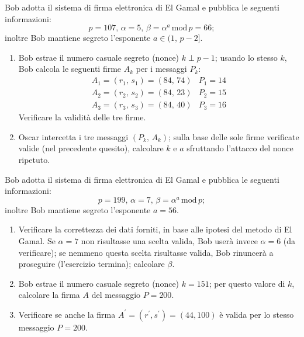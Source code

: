         Bob adotta il sistema di firma elettronica di El Gamal e pubblica le seguenti informazioni: \[
            p=107,\, \alpha = 5,\, \beta = \alpha^a\,\mathrm{mod}\,p=66
        ;\] inoltre Bob mantiene segreto l'esponente $a\in (1,\,p-2]$.
        \begin{enumerate}
            \item Bob estrae il numero casuale segreto (nonce) $k\perp p-1$; usando lo stesso $k$, 
                Bob calcola le seguenti firme $A_k$ per i messaggi $P_k$:
                \[\begin{array}{ll}
                    A_1=(r_1,\,s_1)=(84,\,74) & P_1=14\\
                    A_2=(r_2,\,s_2)=(84,\,23) & P_2=15\\
                    A_3=(r_3,\,s_3)=(84,\,40) & P_3=16
                \end{array}\]
                Verificare la validità delle tre firme.
            \item Oscar intercetta i tre messaggi $(P_k,\,A_k)$; sulla base delle sole firme verificate valide 
                (nel precedente quesito), calcolare $k$ e $a$ sfruttando l'attacco del nonce ripetuto.
        \end{enumerate}

        Bob adotta il sistema di firma elettronica di El Gamal e pubblica le seguenti informazioni: \[
            p=199,\, \alpha = 7,\, \beta = \alpha^a\,\mathrm{mod}\,p
        ;\] inoltre Bob mantiene segreto l'esponente $a=56$.
        \begin{enumerate}
            \item Verificare la correttezza dei dati forniti, in base alle ipotesi del metodo di El Gamal. 
                Se $\alpha=7$ non risultasse una scelta valida, Bob userà invece $\alpha=6$ (da verificare); 
                se nemmeno questa scelta risultasse valida, Bob rinuncerà a proseguire (l'esercizio termina); 
                calcolare $\beta$.
            \item Bob estrae il numero casuale segreto (nonce) $k=151$; per questo valore di $k$, calcolare 
                la firma $A$ del messaggio $P=200$.
            \item Verificare se anche la firma $A^{\prime}=(r^{\prime}, s^{\prime})=(44,100)$ è valida per 
                lo stesso messaggio $P=200$.
        \end{enumerate}

